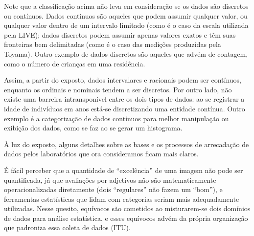 Note que a classificação acima não leva em consideração se os dados são discretos ou contínuos. Dados contínuos são aqueles que podem assumir qualquer valor, ou qualquer valor dentro de um intervalo limitado (como é o caso da escala utilizada pela LIVE); dados discretos podem assumir apenas valores exatos e têm suas fronteiras bem delimitadas (como é o caso das medições produzidas pela Toyama). Outro exemplo de dados discretos são aqueles que advém de contagem, como o número de crianças em uma residência.

Assim, a partir do exposto, dados intervalares e racionais podem ser contínuos, enquanto os ordinais e nominais tendem a ser discretos. Por outro lado, não existe uma barreira intransponível entre os dois tipos de dados: ao se registrar a idade de indivíduos em anos está-se discretizando uma entidade contínua. Outro exemplo é a categorização de dados contínuos para melhor manipulação ou exibição dos dados, como se faz ao se gerar um histograma.

À luz do exposto, alguns detalhes sobre as bases e os processos de arrecadação de dados pelos laboratórios que ora consideramos ficam mais claros.

É fácil perceber que a quantidade de ``excelência'' de uma imagem não pode ser quantificada, já que avaliações por adjetivos não são matematicamente operacionalizadas diretamente (dois ``regulares'' não fazem um ``bom''), e ferramentas estatísticas que lidam com categorias seriam mais adequadamente utilizadas. Nesse quesito, equívocos são cometidos ao misturarem-se dois domínios de dados para análise estatística, e esses equívocos advém da própria organização que padroniza essa coleta de dados (ITU).


